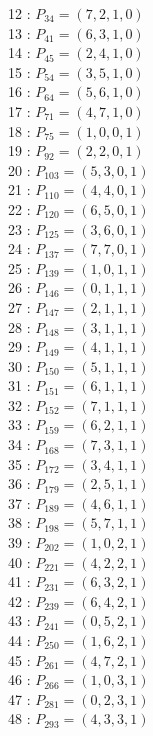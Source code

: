 \documentclass{article}
\begin{document}
{\begin{multicols}{3}
12 : $P_{34}=( 7, 2, 1, 0 )$\\
13 : $P_{41}=( 6, 3, 1, 0 )$\\
14 : $P_{45}=( 2, 4, 1, 0 )$\\
15 : $P_{54}=( 3, 5, 1, 0 )$\\
16 : $P_{64}=( 5, 6, 1, 0 )$\\
17 : $P_{71}=( 4, 7, 1, 0 )$\\
18 : $P_{75}=( 1, 0, 0, 1 )$\\
19 : $P_{92}=( 2, 2, 0, 1 )$\\
20 : $P_{103}=( 5, 3, 0, 1 )$\\
21 : $P_{110}=( 4, 4, 0, 1 )$\\
22 : $P_{120}=( 6, 5, 0, 1 )$\\
23 : $P_{125}=( 3, 6, 0, 1 )$\\
24 : $P_{137}=( 7, 7, 0, 1 )$\\
25 : $P_{139}=( 1, 0, 1, 1 )$\\
26 : $P_{146}=( 0, 1, 1, 1 )$\\
27 : $P_{147}=( 2, 1, 1, 1 )$\\
28 : $P_{148}=( 3, 1, 1, 1 )$\\
29 : $P_{149}=( 4, 1, 1, 1 )$\\
30 : $P_{150}=( 5, 1, 1, 1 )$\\
31 : $P_{151}=( 6, 1, 1, 1 )$\\
32 : $P_{152}=( 7, 1, 1, 1 )$\\
33 : $P_{159}=( 6, 2, 1, 1 )$\\
34 : $P_{168}=( 7, 3, 1, 1 )$\\
35 : $P_{172}=( 3, 4, 1, 1 )$\\
36 : $P_{179}=( 2, 5, 1, 1 )$\\
37 : $P_{189}=( 4, 6, 1, 1 )$\\
38 : $P_{198}=( 5, 7, 1, 1 )$\\
39 : $P_{202}=( 1, 0, 2, 1 )$\\
40 : $P_{221}=( 4, 2, 2, 1 )$\\
41 : $P_{231}=( 6, 3, 2, 1 )$\\
42 : $P_{239}=( 6, 4, 2, 1 )$\\
43 : $P_{241}=( 0, 5, 2, 1 )$\\
44 : $P_{250}=( 1, 6, 2, 1 )$\\
45 : $P_{261}=( 4, 7, 2, 1 )$\\
46 : $P_{266}=( 1, 0, 3, 1 )$\\
47 : $P_{281}=( 0, 2, 3, 1 )$\\
48 : $P_{293}=( 4, 3, 3, 1 )$\\

\end{multicols}}
\end{document}
